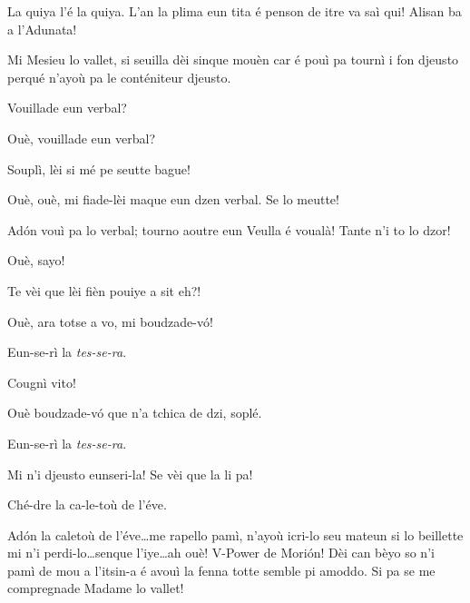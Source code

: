 \begin{drama}

\Prosperospeaks{} La quiya l'é la quiya. L'an la plima eun tita é penson de itre va saì qui! Alisan ba a l'Adunata!

\Pierluigispeaks Mi Mesieu lo vallet, si seuilla dèi sinque mouèn car é pouì pa tournì i fon djeusto perqué n'ayoù pa le conténiteur djeusto.

\Valletspeaks Vouillade eun verbal?

\Prosperospeaks Ouè, vouillade eun verbal?

\Valletspeaks {} Souplì, lèi si mé pe seutte bague!

\Prosperospeaks Ouè, ouè, mi fiade-lèi maque eun dzen verbal. Se lo meutte!

\Pierluigispeaks{} Ad\'on vouì pa lo verbal;  tourno aoutre eun Veulla é voualà! Tante n'i to lo dzor! 

\Valletspeaks Ouè, sayo!


\Prosperospeaks{} Te vèi que lèi fièn pouiye a sit eh?!

\Valletspeaks Ouè, ara totse a vo, mi boudzade-v\'o! 

\Machinaspeaks Eun-se-rì la \textit{tes-se-ra}.

\Prosperospeaks{} Cougnì vito!

\Valletspeaks Ouè boudzade-v\'o que n'a tchica de dzi, soplé.


\Machinaspeaks Eun-se-rì la \textit{tes-se-ra}.

\Prosperospeaks Mi n'i djeusto eunseri-la! Se vèi que la li pa!


\Machinaspeaks Ché-dre la ca-le-toù de l'éve.

\Prosperospeaks{} Ad\'on la caletoù de l'éve\ldots me rapello pamì, n'ayoù icri-lo seu mateun si lo beillette mi n'i perdi-lo\ldots senque l'iye\ldots ah ouè!  V-Power de Mori\'on! Dèi can bèyo so n'i pamì de mou a l'itsin-a é avouì la fenna totte semble pi amoddo. Si pa se me compregnade Madame lo vallet\ok !


\end{drama}
